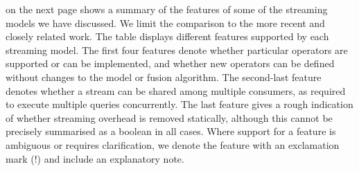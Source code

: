  on the next page shows a summary of the features of some of the streaming models we have discussed.
We limit the comparison to the more recent and closely related work.
The table displays different features supported by each streaming model.
The first four features denote whether particular operators are supported or can be implemented, and whether new operators can be defined without changes to the model or fusion algorithm.
The second-last feature denotes whether a stream can be shared among multiple consumers, as required to execute multiple queries concurrently.
The last feature gives a rough indication of whether streaming overhead is removed statically, although this cannot be precisely summarised as a boolean in all cases.
Where support for a feature is ambiguous or requires clarification, we denote the feature with an exclamation mark (!) and include an explanatory note.

